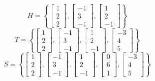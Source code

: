 \documentclass{article}
\begin{document}
\[
H = \left\{
\begin{bmatrix} 1 \\ 2 \\ 2 \end{bmatrix},
\begin{bmatrix} -1 \\ 3 \\ -1 \end{bmatrix},
\begin{bmatrix} 1 \\ 2 \\ -1 \end{bmatrix}
\right\}
\]
\[
T = \left\{
\begin{bmatrix} 1 \\ 2 \\ 2 \end{bmatrix},
\begin{bmatrix} -1 \\ 3 \\ -1 \end{bmatrix},
\begin{bmatrix} 1 \\ 2 \\ -1 \end{bmatrix},
\begin{bmatrix} -3 \\ 4 \\ 5 \end{bmatrix}
\right\}
\]
\[
S = \left\{
\begin{bmatrix} 1 \\ 2 \\ 2 \end{bmatrix},
\begin{bmatrix} -1 \\ 3 \\ -1 \end{bmatrix},
\begin{bmatrix} 1 \\ 2 \\ -1 \end{bmatrix},
\begin{bmatrix} 0 \\ 6 \\ 1 \end{bmatrix},
\begin{bmatrix} -3 \\ 4 \\ 5 \end{bmatrix}
\right\}
\]
\end{document}

